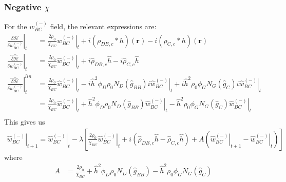 \documentclass{article}
\begin{document}
    \subsubsection{Negative $\chi$}
  For the $w_{BC}^{(-)}$ field, the relevant expressions are:
  \begin{align*}
    \left. \frac{\delta \mathcal{H}}{\delta w_{BC}^{(-)}} \right|_t &=
      \frac{2 \rho_0}{\chi_{BC}} \left. w_{BC}^{(-)} \right|_t
      +i (\rho_{DB,c} \ast h)(\mathbf{r})
      -i (\rho_{C,c} \ast h)(\mathbf{r}) \\
    \left. \hat{\frac{\delta \mathcal{H}}{\delta w_{BC}^{(-)}}} \right|_t &=
      \frac{2 \rho_0}{\chi_{BC}} \left. \hat{w}_{BC}^{(-)} \right|_t
      +i \hat{\rho}_{DB,c} \hat{h}
      -i \hat{\rho}_{C,c} \hat{h} \\
    \left.
      \hat{\frac{\delta \mathcal{H}}{\delta w_{BC}^{(-)}}}
    \right| ^{lin}_t &=
    \frac{2\rho_0}{\chi_{BC}} \left. \hat{w}_{BC}^{(-)} \right|_t
      - i \hat{h}^2 \phi_D \rho_0 N_D
        (\hat{g}_{BB}) i \left.
          \hat{w}_{BC}^{(-)} \right|_t 
          + i \hat{h} ^2  {\rho}_0  
          \left. \phi_G N_G (\hat{g}_{C}) i \hat{w}_{BC}^{(-)} \right|_t
          \\
    &= \frac{2\rho_0}{\chi_{BC}} \left. \hat{w}_{BC}^{(-)} \right|_t
      + \hat{h}^2 \phi_D \rho_0 N_D
        (\hat{g}_{BB})
          \left. \hat{w}_{BC}^{(-)} \right|_t
          -  \hat{h} ^2  {\rho}_0  
          \left. \phi_G N_G (\hat{g}_{C})  \hat{w}_{BC}^{(-)} \right|_t
          \\
  \end{align*}
  This gives us
  \begin{align*}
    \left. \hat{w}_{BC}^{(-)} \right|_{t+1} =
      \left. \hat{w}_{BC}^{(-)} \right|_t - \lambda \left[
        \frac{2\rho_0}{\chi_{BC}} \left. \hat{w}_{BC}^{(-)} \right|_t
        + i ( \hat{\rho}_{DB,c} \hat{h}
              - \hat{\rho}_{C,c} \hat{h} )
        + A ( \left. \hat{w}_{BC}^{(-)} \right|_{t+1}
              - \left. \hat{w}_{BC}^{(-)} \right|_t)
      \right]
  \end{align*}
  where
  \begin{align*}
    A &=
    \frac{2\rho_0}{\chi_{BC}} 
      + \hat{h}^2 \phi_D \rho_0 N_D
        (\hat{g}_{BB})
        -  \hat{h} ^2  {\rho}_0  
          \phi_G N_G (\hat{g}_{C}) 
  \end{align*}
\end{document}
